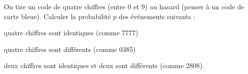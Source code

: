 On tire un code de quatre chiffres (entre 0 et 9) au hasard (penser à un code de carte bleue). Calculer la probabilité $p$ des événements suivants :

\medskip

\question
quatre chiffres sont identiques (comme 7777)

\question
quatre chiffres sont différents (comme 0385)

\question
deux chiffres sont identiques et deux sont différents (comme 2808).

